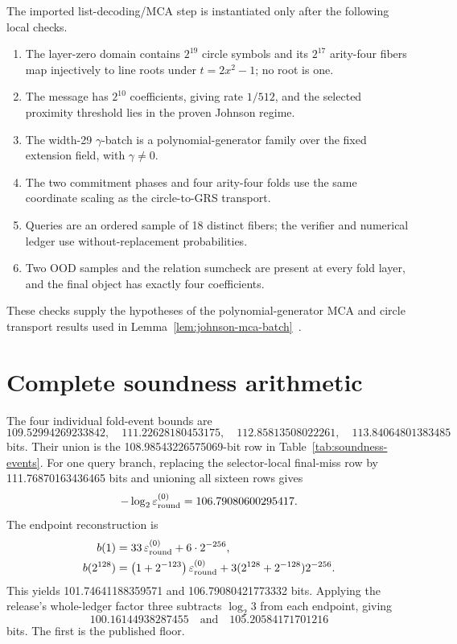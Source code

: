 The imported list-decoding/MCA step is instantiated only after the following
local checks.
\begin{enumerate}
  \item The layer-zero domain contains \(2^{19}\) circle symbols and its
        \(2^{17}\) arity-four fibers map injectively to line roots under
        \(t=2x^2-1\); no root is one.
  \item The message has \(2^{10}\) coefficients, giving rate \(1/512\), and
        the selected proximity threshold lies in the proven Johnson regime.
  \item The width-29 \(\gamma\)-batch is a polynomial-generator family over
        the fixed extension field, with \(\gamma\ne0\).
  \item The two commitment phases and four arity-four folds use the same
        coordinate scaling as the circle-to-GRS transport.
  \item Queries are an ordered sample of 18 distinct fibers; the verifier and
        numerical ledger use without-replacement probabilities.
  \item Two OOD samples and the relation sumcheck are present at every fold
        layer, and the final object has exactly four coefficients.
\end{enumerate}
These checks supply the hypotheses of the polynomial-generator MCA and circle
transport results used in
Lemma~\ref{lem:johnson-mca-batch}~\cite{BordageChiesaGuanManzur2025,CarmonEtAl2026Stwo}.

\section{Complete soundness arithmetic}
\label{app:soundness-ledger}

The four individual fold-event bounds are
\[
 109.52994269233842,\quad
 111.22628180453175,\quad
 112.85813508022261,\quad
 113.84064801383485
\]
bits.  Their union is the 108.98543226575069-bit row in
Table~\ref{tab:soundness-events}.  For one query branch, replacing the
selector-local final-miss row by 111.76870163436465 bits and unioning all
sixteen rows gives
\[
 -\log_2\varepsilon_{\rm round}^{(0)}
 =106.79080600295417.
\]
The endpoint reconstruction is
\begin{align*}
 b(1)
  &=33\,\varepsilon_{\rm round}^{(0)}+6\cdot2^{-256},\\
 b(2^{128})
  &=\left(1+2^{-123}\right)\varepsilon_{\rm round}^{(0)}
    +3(2^{128}+2^{-128})2^{-256}.
\end{align*}
This yields 101.74641188359571 and 106.79080421773332 bits.  Applying the
release's whole-ledger factor three subtracts \(\log_2 3\) from each endpoint,
giving
\[
 100.16144938287455\quad\text{and}\quad105.20584171701216
\]
bits.  The first is the published floor.

